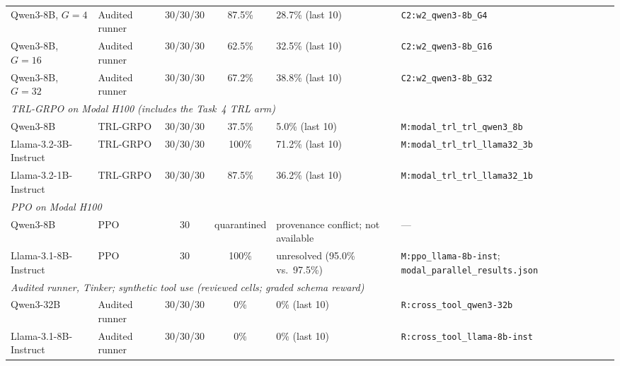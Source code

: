 \documentclass{article}
\begin{document}
\begin{table}[t]
{\begin{tabular}{@{}l l c c l l@{}}
Qwen3-8B, $G=4$ & Audited runner & 30/30/30 & 87.5\% & 28.7\% (last 10) & \texttt{C2:w2\_qwen3-8b\_G4} \\ %
Qwen3-8B, $G=16$ & Audited runner & 30/30/30 & 62.5\% & 32.5\% (last 10) & \texttt{C2:w2\_qwen3-8b\_G16} \\ %
Qwen3-8B, $G=32$ & Audited runner & 30/30/30 & 67.2\% & 38.8\% (last 10) & \texttt{C2:w2\_qwen3-8b\_G32} \\ %
\midrule
\multicolumn{6}{l}{\textit{TRL-GRPO on Modal H100 (includes the Task~4 TRL arm)}} \\
Qwen3-8B & TRL-GRPO & 30/30/30 & 37.5\% & 5.0\% (last 10) & \texttt{M:modal\_trl\_trl\_qwen3\_8b} \\ %
Llama-3.2-3B-Instruct & TRL-GRPO & 30/30/30 & 100\% & 71.2\% (last 10) & \texttt{M:modal\_trl\_trl\_llama32\_3b} \\ %
Llama-3.2-1B-Instruct & TRL-GRPO & 30/30/30 & 87.5\% & 36.2\% (last 10) & \texttt{M:modal\_trl\_trl\_llama32\_1b} \\ %
\midrule
\multicolumn{6}{l}{\textit{PPO on Modal H100}} \\
Qwen3-8B & PPO & 30 & quarantined & provenance conflict; not available & --- \\
Llama-3.1-8B-Instruct & PPO & 30 & 100\% & unresolved (95.0\% vs.\ 97.5\%) & \texttt{M:ppo\_llama-8b-inst}; \texttt{modal\_parallel\_results.json} \\
\midrule
\multicolumn{6}{l}{\textit{Audited runner, Tinker; synthetic tool use (reviewed cells; graded schema reward)}} \\
Qwen3-32B & Audited runner & 30/30/30 & 0\% & 0\% (last 10) & \texttt{R:cross\_tool\_qwen3-32b} \\ %
Llama-3.1-8B-Instruct & Audited runner & 30/30/30 & 0\% & 0\% (last 10) & \texttt{R:cross\_tool\_llama-8b-inst} \\ %
\bottomrule
\end{tabular}}
\end{table}
\end{document}
